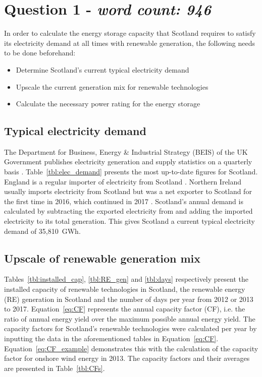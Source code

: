 \section{Question 1 - \textit{word count: 946}}



In order to calculate the energy storage capacity that Scotland requires to satisfy its electricity demand at all times with renewable generation, the following needs to be done beforehand:
\begin{itemize}
	\item Determine Scotland's current typical electricity demand
	\item Upscale the current generation mix for renewable technologies
	\item Calculate the necessary power rating for the energy storage
\end{itemize}




\subsection{Typical electricity demand}

The Department for Business, Energy {\&} Industrial Strategy (BEIS) of the UK Government publishes electricity generation and supply statistics on a quarterly basis \citep{BEIS2018ElecUK}.
Table~\ref{tbl:elec_demand} presents the most up-to-date figures for Scotland.
England is a regular importer of electricity from Scotland \citep{BEIS2018EnergyTrends}.
Northern Ireland usually imports electricity from Scotland but was a net exporter to Scotland for the first time in 2016, which continued in 2017 \citep{BEIS2018EnergyTrends}.
Scotland's annual demand is calculated by subtracting the exported electricity from and adding the imported electricity to its total generation.
This gives Scotland a current typical electricity demand of 35,810~GWh.






\subsection{Upscale of renewable generation mix}

Tables~\ref{tbl:installed_cap}, \ref{tbl:RE_gen} and \ref{tbl:days} respectively present the installed capacity of renewable technologies in Scotland, the renewable energy (RE) generation in Scotland and the number of days per year from 2012 or 2013 to 2017.
Equation~\ref{eq:CF} represents the annual capacity factor (CF), i.e. the ratio of annual energy yield over the maximum possible annual energy yield.
The capacity factors for Scotland's renewable technologies were calculated per year by inputting the data in the aforementioned tables in Equation~\ref{eq:CF}.
Equation~\ref{eq:CF_example} demonstrates this with the calculation of the capacity factor for onshore wind energy in 2013.
The capacity factors and their averages are presented in Table~\ref{tbl:CFs}.

